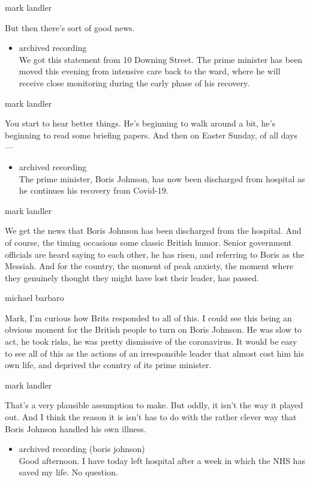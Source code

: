mark landler

But then there's sort of good news.

\begin{itemize}
\tightlist
\item
  archived recording\\
  We got this statement from 10 Downing Street. The prime minister has
  been moved this evening from intensive care back to the ward, where he
  will receive close monitoring during the early phase of his recovery.
\end{itemize}

mark landler

You start to hear better things. He's beginning to walk around a bit,
he's beginning to read some briefing papers. And then on Easter Sunday,
of all days ---

\begin{itemize}
\tightlist
\item
  archived recording\\
  The prime minister, Boris Johnson, has now been discharged from
  hospital as he continues his recovery from Covid-19.
\end{itemize}

mark landler

We get the news that Boris Johnson has been discharged from the
hospital. And of course, the timing occasions some classic British
humor. Senior government officials are heard saying to each other, he
has risen, and referring to Boris as the Messiah. And for the country,
the moment of peak anxiety, the moment where they genuinely thought they
might have lost their leader, has passed.

michael barbaro

Mark, I'm curious how Brits responded to all of this. I could see this
being an obvious moment for the British people to turn on Boris Johnson.
He was slow to act, he took risks, he was pretty dismissive of the
coronavirus. It would be easy to see all of this as the actions of an
irresponsible leader that almost cost him his own life, and deprived the
country of its prime minister.

mark landler

That's a very plausible assumption to make. But oddly, it isn't the way
it played out. And I think the reason it is isn't has to do with the
rather clever way that Boris Johnson handled his own illness.

\begin{itemize}
\tightlist
\item
  archived recording (boris johnson)\\
  Good afternoon. I have today left hospital after a week in which the
  NHS has saved my life. No question.
\end{itemize}

